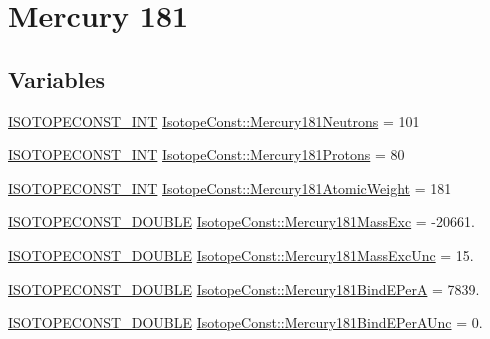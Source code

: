 \hypertarget{group___isotope_const-_mercury-_hg181}{}\section{Mercury 181}
\label{group___isotope_const-_mercury-_hg181}
\subsection*{Variables}
\begin{DoxyCompactItemize}
\item 
\mbox{\hyperlink{group___isotope_const-_macros_ga5f18360b3e99483a35c32d789e62621c}{I\+S\+O\+T\+O\+P\+E\+C\+O\+N\+S\+T\+\_\+\+I\+NT}} \mbox{\hyperlink{group___isotope_const-_mercury-_hg181_ga58eda58c935725c84c7f44cc582a184b}{Isotope\+Const\+::\+Mercury181\+Neutrons}} = 101
\item 
\mbox{\hyperlink{group___isotope_const-_macros_ga5f18360b3e99483a35c32d789e62621c}{I\+S\+O\+T\+O\+P\+E\+C\+O\+N\+S\+T\+\_\+\+I\+NT}} \mbox{\hyperlink{group___isotope_const-_mercury-_hg181_ga2b359f0bedffa2f92517c35d4754e5ad}{Isotope\+Const\+::\+Mercury181\+Protons}} = 80
\item 
\mbox{\hyperlink{group___isotope_const-_macros_ga5f18360b3e99483a35c32d789e62621c}{I\+S\+O\+T\+O\+P\+E\+C\+O\+N\+S\+T\+\_\+\+I\+NT}} \mbox{\hyperlink{group___isotope_const-_mercury-_hg181_gad9a3fcc1b5fd5efbb18caa9456b9988f}{Isotope\+Const\+::\+Mercury181\+Atomic\+Weight}} = 181
\item 
\mbox{\hyperlink{group___isotope_const-_macros_ga8f45a7272ce02c0b4c65c44636ed719a}{I\+S\+O\+T\+O\+P\+E\+C\+O\+N\+S\+T\+\_\+\+D\+O\+U\+B\+LE}} \mbox{\hyperlink{group___isotope_const-_mercury-_hg181_ga95e3cd076af0f7a54449aa435fa737fd}{Isotope\+Const\+::\+Mercury181\+Mass\+Exc}} = -\/20661.
\item 
\mbox{\hyperlink{group___isotope_const-_macros_ga8f45a7272ce02c0b4c65c44636ed719a}{I\+S\+O\+T\+O\+P\+E\+C\+O\+N\+S\+T\+\_\+\+D\+O\+U\+B\+LE}} \mbox{\hyperlink{group___isotope_const-_mercury-_hg181_ga0dc5e1d1fc487cfa753232dce766a844}{Isotope\+Const\+::\+Mercury181\+Mass\+Exc\+Unc}} = 15.
\item 
\mbox{\hyperlink{group___isotope_const-_macros_ga8f45a7272ce02c0b4c65c44636ed719a}{I\+S\+O\+T\+O\+P\+E\+C\+O\+N\+S\+T\+\_\+\+D\+O\+U\+B\+LE}} \mbox{\hyperlink{group___isotope_const-_mercury-_hg181_ga58bb1e10ce3a621eee6e16220cc90a46}{Isotope\+Const\+::\+Mercury181\+Bind\+E\+PerA}} = 7839.
\item 
\mbox{\hyperlink{group___isotope_const-_macros_ga8f45a7272ce02c0b4c65c44636ed719a}{I\+S\+O\+T\+O\+P\+E\+C\+O\+N\+S\+T\+\_\+\+D\+O\+U\+B\+LE}} \mbox{\hyperlink{group___isotope_const-_mercury-_hg181_gaf31ed5dc8b21e22647bfd030397d0d80}{Isotope\+Const\+::\+Mercury181\+Bind\+E\+Per\+A\+Unc}} = 0.

\end{DoxyCompactItemize}
